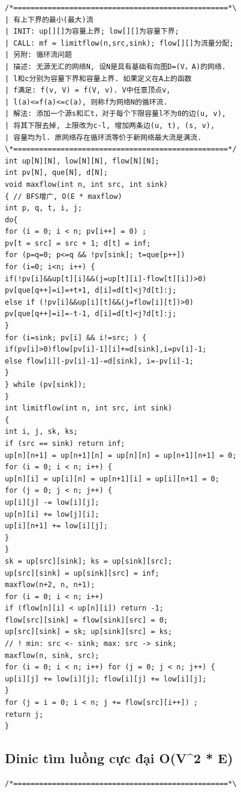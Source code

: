 \documentclass[11pt]{article}
\begin{document}
\begingroup
\scriptsize
\begin{verbatim}
/*==================================================*\
| 有上下界的最小(最大)流
| INIT: up[][]为容量上界; low[][]为容量下界;
| CALL: mf = limitflow(n,src,sink); flow[][]为流量分配;
| 另附: 循环流问题
| 描述: 无源无汇的网络N, 设N是具有基础有向图D=(V，A)的网络.
| l和c分别为容量下界和容量上界. 如果定义在A上的函数
| f满足: f(v, V) = f(V, v). V中任意顶点v,
| l(a)<=f(a)<=c(a), 则称f为网络N的循环流.
| 解法: 添加一个源s和汇t，对于每个下限容量l不为0的边(u, v),
| 将其下限去掉, 上限改为c-l, 增加两条边(u, t), (s, v),
| 容量均为l. 原网络存在循环流等价于新网络最大流是满流.
\*==================================================*/
int up[N][N], low[N][N], flow[N][N];
int pv[N], que[N], d[N];
void maxflow(int n, int src, int sink)
{ // BFS增广, O(E * maxflow)
int p, q, t, i, j;
do{
for (i = 0; i < n; pv[i++] = 0) ;
pv[t = src] = src + 1; d[t] = inf;
for (p=q=0; p<=q && !pv[sink]; t=que[p++])
for (i=0; i<n; i++) {
if(!pv[i]&&up[t][i]&&(j=up[t][i]-flow[t][i])>0)
pv[que[q++]=i]=+t+1, d[i]=d[t]<j?d[t]:j;
else if (!pv[i]&&up[i][t]&&(j=flow[i][t])>0)
pv[que[q++]=i]=-t-1, d[i]=d[t]<j?d[t]:j;
}
for (i=sink; pv[i] && i!=src; ) {
if(pv[i]>0)flow[pv[i]-1][i]+=d[sink],i=pv[i]-1;
else flow[i][-pv[i]-1]-=d[sink], i=-pv[i]-1;
}
} while (pv[sink]);
}
int limitflow(int n, int src, int sink)
{
int i, j, sk, ks;
if (src == sink) return inf;
up[n][n+1] = up[n+1][n] = up[n][n] = up[n+1][n+1] = 0;
for (i = 0; i < n; i++) {
up[n][i] = up[i][n] = up[n+1][i] = up[i][n+1] = 0;
for (j = 0; j < n; j++) {
up[i][j] -= low[i][j];
up[n][i] += low[j][i];
up[i][n+1] += low[i][j];
}
}
sk = up[src][sink]; ks = up[sink][src];
up[src][sink] = up[sink][src] = inf;
maxflow(n+2, n, n+1);
for (i = 0; i < n; i++)
if (flow[n][i] < up[n][i]) return -1;
flow[src][sink] = flow[sink][src] = 0;
up[src][sink] = sk; up[sink][src] = ks;
// ! min: src <- sink; max: src -> sink;
maxflow(n, sink, src);
for (i = 0; i < n; i++) for (j = 0; j < n; j++) {
up[i][j] += low[i][j]; flow[i][j] += low[i][j];
}
for (j = i = 0; i < n; j += flow[src][i++]) ;
return j;
}
\end{verbatim}
\endgroup

\subsection{Dinic tìm luồng cực đại O(V\textasciicircum{}2 * E)}

\begingroup
\scriptsize
\begin{verbatim}
/*==================================================*\
\end{verbatim}
\endgroup
\end{document}
